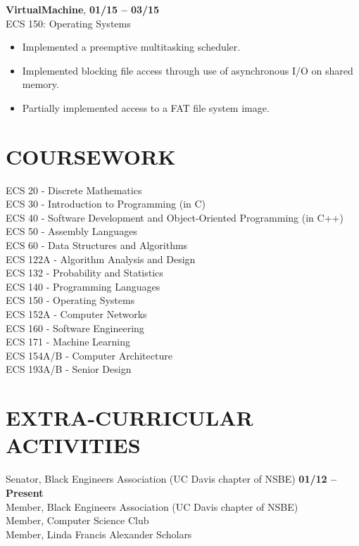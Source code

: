 \documentclass[line, letterpaper, 10pt]{res}
\begin{document}
\begin{resume}
    {\bf VirtualMachine}, \hfill  {\bf 01/15 -- 03/15} \\
    ECS 150: Operating Systems
    \begin{itemize} \itemsep -2pt
        \item Implemented a preemptive multitasking scheduler.
        \item Implemented blocking file access through use of asynchronous I/O on shared memory.
        \item Partially implemented access to a FAT file system image.
    \end{itemize}

\section{COURSEWORK}
    ECS 20 - Discrete Mathematics \\
    ECS 30 - Introduction to Programming (in C) \\
    ECS 40 - Software Development and Object-Oriented Programming (in C++) \\
    ECS 50 - Assembly Languages \\
    ECS 60 - Data Structures and Algorithms \\
    ECS 122A - Algorithm Analysis and Design \\
    ECS 132 - Probability and Statistics \\
    ECS 140 - Programming Languages \\
    ECS 150 - Operating Systems \\
    ECS 152A - Computer Networks \\
    ECS 160 - Software Engineering \\
    ECS 171 - Machine Learning \\
    ECS 154A/B - Computer Architecture \\
    ECS 193A/B - Senior Design \\

\section{EXTRA-CURRICULAR ACTIVITIES}
    Senator, Black Engineers Association (UC Davis chapter of NSBE) \hfill {\bf 01/12 -- Present} \\
    Member, Black Engineers Association (UC Davis chapter of NSBE) \\
    Member, Computer Science Club \\
    Member, Linda Francis Alexander Scholars \\


\end{resume}
\end{document}
